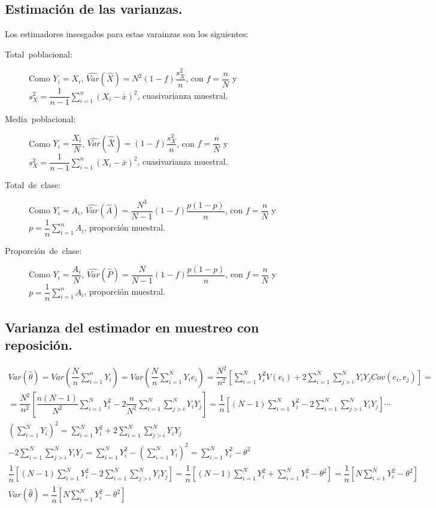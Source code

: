 \subsection{Estimaci\'on de las varianzas.}

Los estimadores insesgados para estas varainzas son los siguientes:
\begin{description}
\item [{Total~poblacional:}] Como $Y_{i}=X_{i}$, $\hat{Var}\left(\hat{X}\right)=N^{2}\left(1-f\right)\dfrac{s_{X}^{2}}{n}$,
con $f=\dfrac{n}{N}$ y $s_{X}^{2}=\dfrac{1}{n-1}\sum_{i=1}^{n}\left(X_{i}-\bar{x}\right)^{2}$,
cuasivarianza muestral.
\item [{Media~poblacional:}] Como $Y_{i}=\dfrac{X_{i}}{N}$, $\hat{Var}\left(\hat{\bar{X}}\right)=\left(1-f\right)\dfrac{s_{X}^{2}}{n}$,
con $f=\dfrac{n}{N}$ y $s_{X}^{2}=\dfrac{1}{n-1}\sum_{i=1}^{n}\left(X_{i}-\bar{x}\right)^{2}$,
cuasivarianza muestral.
\item [{Total~de~clase:}] Como $Y_{i}=A_{i}$, $\hat{Var}\left(\hat{A}\right)=\dfrac{N^{3}}{N-1}\left(1-f\right)\dfrac{p\left(1-p\right)}{n}$,
con $f=\dfrac{n}{N}$ y $p=\dfrac{1}{n}\sum_{i=1}^{n}A_{i}$, proporci\'on
muestral.
\item [{Proporci\'on~de~clase:}] Como $Y_{i}=\dfrac{A_{i}}{N}$, $\hat{Var}\left(\hat{P}\right)=\dfrac{N}{N-1}\left(1-f\right)\dfrac{p\left(1-p\right)}{n}$,
con $f=\dfrac{n}{N}$ y $p=\dfrac{1}{n}\sum_{i=1}^{n}A_{i}$, proporci\'on
muestral.
\end{description}

\subsection{Varianza del estimador en muestreo con reposici\'on.}

\[
\begin{array}{c}
Var\left(\hat{\theta}\right)=Var\left(\dfrac{N}{n}\sum_{i=1}^{n}Y_{i}\right)=Var\left(\dfrac{N}{n}\sum_{i=1}^{N}Y_{i}e_{i}\right)=\dfrac{N^{2}}{n^{2}}\left[\sum_{i=1}^{N}Y_{i}^{2}V\left(e_{i}\right)+2\sum_{i=1}^{N}\sum_{j>i}^{N}Y_{i}Y_{j}Cov\left(e_{i},e_{j}\right)\right]=\\
=\dfrac{N^{2}}{n^{2}}\left[\dfrac{n\left(N-1\right)}{N^{2}}\sum_{i=1}^{N}Y_{i}^{2}-2\dfrac{n}{N^{2}}\sum_{i=1}^{N}\sum_{j>i}^{N}Y_{i}Y_{j}\right]=\dfrac{1}{n}\left[\left(N-1\right)\sum_{i=1}^{N}Y_{i}^{2}-2\sum_{i=1}^{N}\sum_{j>i}^{N}Y_{i}Y_{j}\right]\cdots\\
\left(\sum_{i=1}^{N}Y_{i}\right)^{2}=\sum_{i=1}^{N}Y_{i}^{2}+2\sum_{i=1}^{N}\sum_{j>i}^{N}Y_{i}Y_{j}\\
-2\sum_{i=1}^{N}\sum_{j>i}^{N}Y_{i}Y_{j}=\sum_{i=1}^{N}Y_{i}^{2}-\left(\sum_{i=1}^{N}Y_{i}\right)^{2}=\sum_{i=1}^{N}Y_{i}^{2}-\theta^{2}\\
\dfrac{1}{n}\left[\left(N-1\right)\sum_{i=1}^{N}Y_{i}^{2}-2\sum_{i=1}^{N}\sum_{j>i}^{N}Y_{i}Y_{j}\right]=\dfrac{1}{n}\left[\left(N-1\right)\sum_{i=1}^{N}Y_{i}^{2}+\sum_{i=1}^{N}Y_{i}^{2}-\theta^{2}\right]=\dfrac{1}{n}\left[N\sum_{i=1}^{N}Y_{i}^{2}-\theta^{2}\right]\\
Var\left(\hat{\theta}\right)=\dfrac{1}{n}\left[N\sum_{i=1}^{N}Y_{i}^{2}-\theta^{2}\right]
\end{array}
\]


